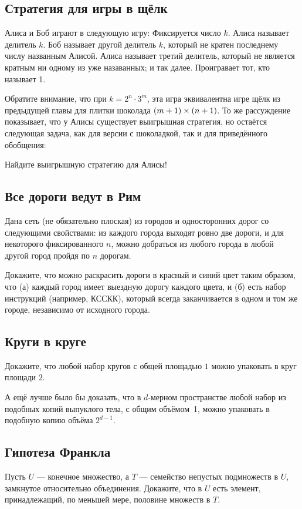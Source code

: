 \subsection*{Стратегия для игры в щёлк}

Алиса и Боб играют в следующую игру:
Фиксируется число $k$.
Алиса называет делитель $k$.
Боб называет другой делитель $k$, который не кратен последнему числу названным Алисой.
Алиса называет третий делитель, который не является кратным ни одному из уже назаванных; 
и так далее.
Проигравает тот, кто называет 1.

Обратите внимание, что при $k=2^{n}\cdot 3^{m}$, эта игра эквивалентна игре щёлк из предыдущей главы для плитки шоколада $(m+1)\z\times (n+1)$.
То же рассуждение показывает, что у Алисы существует выигрышная стратегия, но остаётся следующая задача, как для версии с шоколадкой, так и для приведённого обобщения:

Найдите выигрышную стратегию для Алисы!

\subsection*{Все дороги ведут в Рим}

Дана сеть (не обязательно плоская) из городов и односторонних дорог со следующими свойствами:
из каждого города выходят ровно две дороги, и для некоторого фиксированного $n$, можно добраться из любого города в любой другой город пройдя по $n$ дорогам.

Докажите, что можно раскрасить дороги в красный и синий цвет таким образом, что (а) каждый город имеет выездную дорогу каждого цвета, и (б) есть набор инструкций (например, КССКК), который всегда заканчивается в одном и том же городе, независимо от исходного города.

\subsection*{Круги в круге}

Докажите, что любой набор кругов с общей площадью $1$ можно упаковать в круг площади $2$.

А ещё лучше было бы доказать, что в $d$-мерном пространстве любой набор из подобных копий выпуклого тела, с общим объёмом~1, можно упаковать в подобную копию объёма $2^{d-1}$.

\subsection*{Гипотеза Франкла}

Пусть $U$ --- конечное множество, а $T$ --- семейство непустых подмножеств в $U$, замкнутое относительно объединения.
Докажите, что в $U$ есть элемент, принадлежащий, по меньшей мере, половине множеств в $T$.
